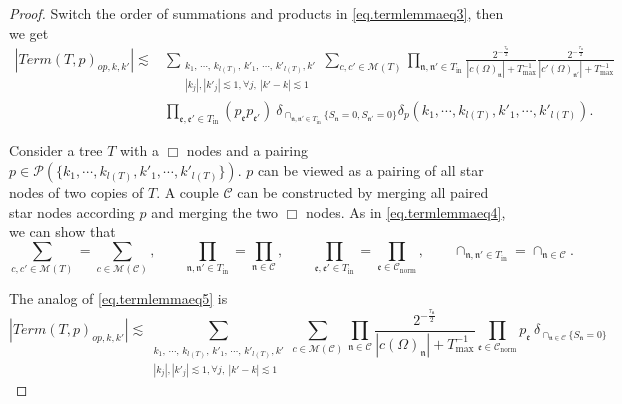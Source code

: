 \begin{proof}
Switch the order of summations and products in \eqref{eq.termlemmaeq3}, then we get
\begin{equation}\label{eq.termlemmaeq2op}
\begin{split}
    |Term(T, p)_{op,k,k'}|\lesssim& \sum_{\substack{k_1,\, \cdots,\, k_{l(T)},\, k'_1,\, \cdots,\, k'_{l(T)}, k'\\ |k_{j}|, |k'_j|\lesssim 1, \forall j,\ |k'-k|\lesssim 1}} \sum_{c, c'\in \mathscr{M}(T) }\prod_{\mathfrak{n}, \mathfrak{n}'\in T_{\text{in}}}\frac{2^{-\frac{\tau_{\mathfrak{n}}}{2}}}{|c(\Omega)_{\mathfrak{n}}|+T^{-1}_{\text{max}}}\frac{2^{-\frac{\tau_{\mathfrak{n}}}{2}}}{|c'(\Omega)_{\mathfrak{n}'}|+T^{-1}_{\text{max}}}
    \\
    & \prod_{\mathfrak{e},\mathfrak{e}'\in T_{\text{in}}} (p_{\mathfrak{e}}p_{\mathfrak{e}'})\ \delta_{\cap_{\mathfrak{n},\mathfrak{n}'\in T_{\text{in}}} \{S_{\mathfrak{n}}=0, S_{\mathfrak{n}'}=0\}} \delta_{p}(k_1,\cdots, k_{l(T)}, k'_1,\cdots, k'_{l(T)}).
\end{split}
\end{equation}

Consider a tree $T$ with a $\Box$ nodes and a pairing $p\in \mathcal{P}(\{k_1,\cdots, k_{l(T)}, k'_1,\cdots, k'_{l(T)}\})$. $p$ can be viewed as a pairing of all star nodes of two copies of $T$. A couple $\mathcal{C}$ can be constructed by merging all paired star nodes according $p$ and merging the two $\Box$ nodes. As in \eqref{eq.termlemmaeq4}, we can show that
\begin{equation}\label{eq.termlemmaeq4op'}
\sum_{c, c'\in \mathscr{M}(T) }=\sum_{c\in \mathscr{M}(\mathcal{C}) },\qquad \prod_{\mathfrak{n}, \mathfrak{n}'\in T_{\text{in}}}=\prod_{\mathfrak{n}\in \mathcal{C}}, \qquad \prod_{\mathfrak{e},\mathfrak{e}'\in T_{\text{in}}}=\prod_{\mathfrak{e}\in \mathcal{C}_{\text{norm}}},\qquad \cap_{\mathfrak{n},\mathfrak{n}'\in T_{\text{in}}}=\cap_{\mathfrak{n}\in \mathcal{C}}.    
\end{equation}


The analog of \eqref{eq.termlemmaeq5} is 
\begin{equation}\label{eq.termlemmaeq5op}
|Term(T, p)_{op,k,k'}|\lesssim \sum_{\substack{k_1,\, \cdots,\, k_{l(T)},\, k'_1,\, \cdots,\, k'_{l(T)}, k'\\ |k_{j}|, |k'_j|\lesssim 1, \forall j,\ |k'-k|\lesssim 1}} \sum_{c\in \mathscr{M}(\mathcal{C}) }\prod_{\mathfrak{n}\in \mathcal{C}}\frac{2^{-\frac{\tau_{\mathfrak{n}}}{2}}}{|c(\Omega)_{\mathfrak{n}}|+T^{-1}_{\text{max}}} \prod_{\mathfrak{e}\in \mathcal{C}_{\text{norm}}} p_{\mathfrak{e}}\  \delta_{\cap_{\mathfrak{n}\in \mathcal{C}} \{S_{\mathfrak{n}}=0\}}
\end{equation}


\end{proof}
